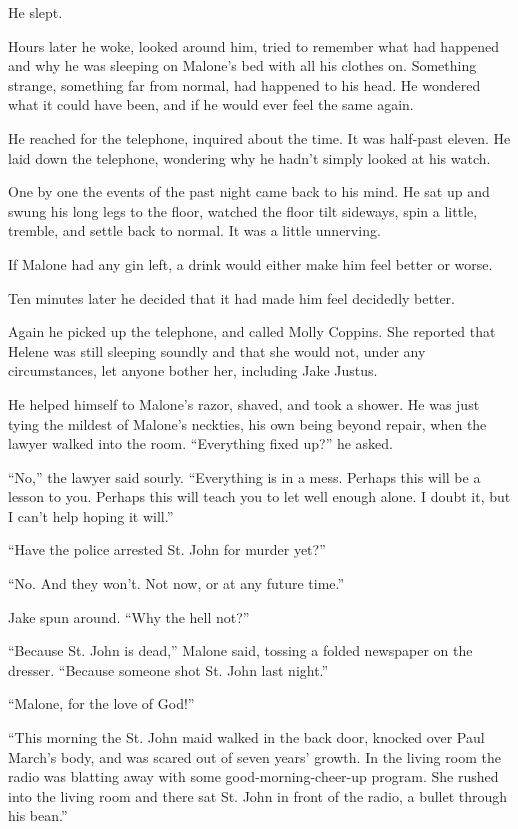 \documentclass{novel}
\begin{document}
He slept.

Hours later he woke, looked around him, tried to remember what had happened and why he was sleeping on Malone’s bed with all his clothes on. Something strange, something far from normal, had happened to his head. He wondered what it could have been, and if he would ever feel the same again.

He reached for the telephone, inquired about the time. It was half-past eleven. He laid down the telephone, wondering why he hadn’t simply looked at his watch.

One by one the events of the past night came back to his mind. He sat up and swung his long legs to the floor, watched the floor tilt sideways, spin a little, tremble, and settle back to normal. It was a little unnerving.

If Malone had any gin left, a drink would either make him feel better or worse.

Ten minutes later he decided that it had made him feel decidedly better.

Again he picked up the telephone, and called Molly Coppins. She reported that Helene was still sleeping soundly and that she would not, under any circumstances, let anyone bother her, including Jake Justus.

He helped himself to Malone’s razor, shaved, and took a shower. He was just tying the mildest of Malone’s neckties, his own being beyond repair, when the lawyer walked into the room. “Everything fixed up?” he asked.

“No,” the lawyer said sourly. “Everything is in a mess. Perhaps this will be a lesson to you. Perhaps this will teach you to let well enough alone. I doubt it, but I can’t help hoping it will.”

“Have the police arrested St. John for murder yet?”

“No. And they won’t. Not now, or at any future time.”

Jake spun around. “Why the hell not?”

“Because St. John is dead,” Malone said, tossing a folded newspaper on the dresser. “Because someone shot St. John last night.”

“Malone, for the love of God!”

“This morning the St. John maid walked in the back door, knocked over Paul March’s body, and was scared out of seven years’ growth. In the living room the radio was blatting away with some good-morning-cheer-up program. She rushed into the living room and there sat St. John in front of the radio, a bullet through his bean.”
\end{document}
